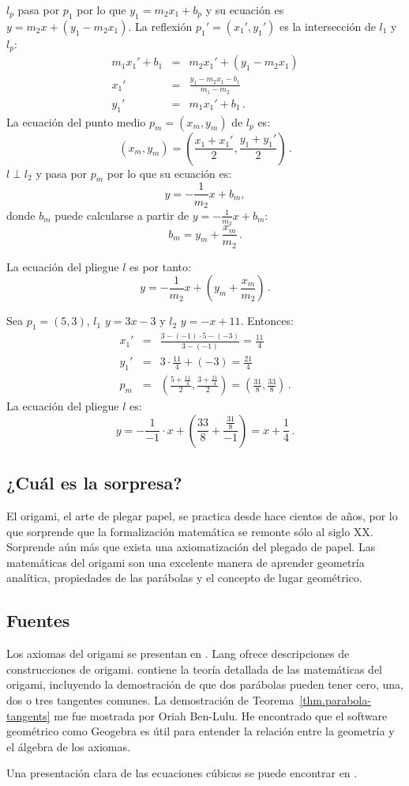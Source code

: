 $l_p$ pasa por $p_1$ por lo que $y_1=m_2x_1+b_p$ y su ecuación es $y=m_2x+(y_1-m_2x_1)$. La reflexión $p_1'=(x_1',y_1')$ es la intersección de $l_1$ y $l_p$:
\begin{eqnarray*}
m_1x_1'+b_1&=&m_2x_1'+(y_1-m_2x_1)\\
x_1'&=&\frac{y_1-m_2x_1-b_1}{m_1-m_2}\\
y_1'&=&m_1x_1'+b_1\,.
\end{eqnarray*}
La ecuación del punto medio $p_m=(x_m,y_m)$ de $l_p$ es:
\[
(x_m,y_m)=\left(\frac{x_1+x_1'}{2},\frac{y_1+y_1'}{2}\right)\,.
\]
$l\perp l_2$ y pasa por $p_m$ por lo que su ecuación es:
\[
y=-\frac{1}{m_2}x+b_m,
\]
donde $b_m$ puede calcularse a partir de $y=-\displaystyle\frac{1}{m_2}x+b_m$:
\[b_m=y_m+\frac{x_m}{m_2}\,.\]

La ecuación del pliegue $l$ es por tanto:
\[
y=-\frac{1}{m_2}x+\left(y_m+\displaystyle\frac{x_m}{m_2}\right)\,.
\]
\begin{example}
Sea $p_1=(5,3)$, $l_1$ $y=3x-3$ y $l_2$ $y=-x+11$. Entonces:
\begin{eqnarray*}
x_1'&=&\frac{3-(-1)\cdot 5-(-3)}{3-(-1)}=\frac{11}{4}\\
y_1'&=&3\cdot \frac{11}{4} + (-3)=\frac{21}{4}\\
p_m&=&\left(\frac{5+\displaystyle\frac{11}{4}}{2},\frac{3+\displaystyle\frac{21}{4}}{2}\right)=\left(\frac{31}{8},\frac{33}{8}\right)\,.
\end{eqnarray*}
La ecuación del pliegue $l$ es:
\[
y=-\frac{1}{-1}\cdot x+\left(\frac{33}{8}+\frac{\displaystyle\frac{31}{8}}{-1}\right)=x+\frac{1}{4}\,.
\]
\end{example}

\subsection*{¿Cuál es la sorpresa?}

El origami, el arte de plegar papel, se practica desde hace cientos de años, por lo que sorprende que la formalización matemática se remonte sólo al siglo XX. Sorprende aún más que exista una axiomatización del plegado de papel. Las matemáticas del origami son una excelente manera de aprender geometría analítica, propiedades de las parábolas y el concepto de lugar geométrico.



\subsection*{Fuentes}

Los axiomas del origami se presentan en \cite{wiki:hh-axioms}. Lang \cite{lang} ofrece descripciones de construcciones de origami. 
\cite[Capítulo~10]{martin} contiene la teoría detallada de las matemáticas del origami, incluyendo la demostración de que dos parábolas pueden tener cero, una, dos o tres tangentes comunes. La demostración de Teorema~\ref{thm.parabola-tangents} me fue mostrada por Oriah Ben-Lulu. He encontrado que el software geométrico como Geogebra es útil para entender la relación entre la geometría y el álgebra de los axiomas.

Una presentación clara de las ecuaciones cúbicas se puede encontrar en \cite[Capítulos~1,\ 2]{jorg}.
